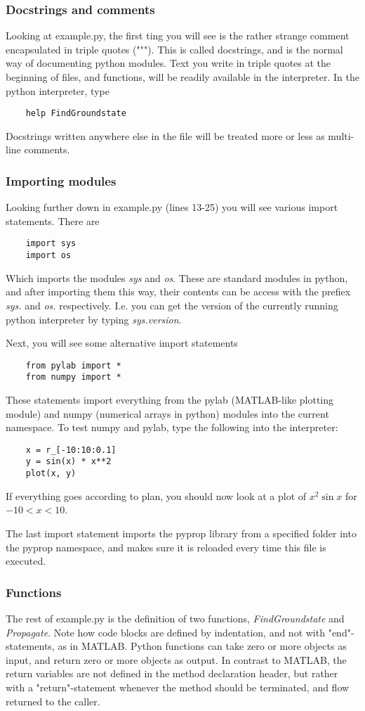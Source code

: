 \documentclass[a4paper,12pt]{report}
\begin{document}
\subsubsection*{Docstrings and comments}
Looking at example.py, the first ting you will see is the rather strange comment encapsulated in triple quotes ("""). This
is called docstrings, and is the normal way of documenting python modules. Text you write in triple quotes at the beginning 
of files, and functions, will be readily available in the interpreter. In the python interpreter, type
\begin{verbatim}
	help FindGroundstate
\end{verbatim}
Docstrings written anywhere else in the file will be treated more or less as multi-line comments. 

\subsubsection*{Importing modules}
Looking further down in example.py (lines 13-25) you will see various import statements. There are
\begin{verbatim}
	import sys
	import os
\end{verbatim}
Which imports the modules \textit{sys} and \textit{os}. These are standard modules in python, and after importing them this
way, their contents can be access with the prefiex \textit{sys.} and \textit{os.} respectively. I.e. you can get the version
of the currently running python interpreter by typing \textit{sys.version}.

Next, you will see some alternative import statements
\begin{verbatim}
	from pylab import *
	from numpy import *
\end{verbatim}
These statements import everything from the pylab (MATLAB-like plotting module) and numpy (numerical arrays in python)
modules into the current namespace. To test numpy and pylab, type the following into the interpreter:
\begin{verbatim}
	x = r_[-10:10:0.1]
	y = sin(x) * x**2
	plot(x, y)
\end{verbatim}
If everything goes according to plan, you should now look at a plot of $x^2 \sin x $ for $-10 < x < 10$.

The last import statement imports the pyprop library from a specified folder into the pyprop namespace, and makes sure 
it is reloaded every time this file is executed.

\subsubsection*{Functions}
The rest of example.py is the definition of two functions, \textit{FindGroundstate} and \textit{Propagate}. 
Note how code blocks are defined by indentation, and not with "end"-statements, as in MATLAB. 
Python functions can take zero or more objects
as input, and return zero or more objects as output. In contrast to MATLAB, the return variables are not defined in the
method declaration header, but rather with a "return"-statement whenever the method should be terminated, and flow returned
to the caller. 
\end{document}
